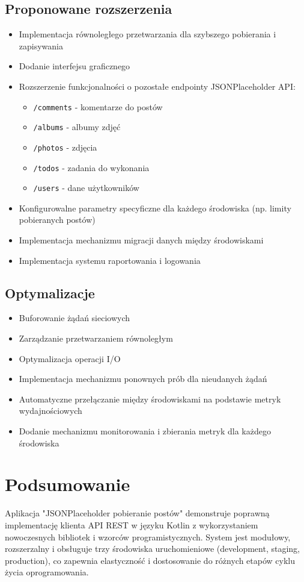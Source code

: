 \documentclass[12pt,a4paper]{article}
\begin{document}
\subsection{Proponowane rozszerzenia}
\begin{itemize}
    \item Implementacja równoległego przetwarzania dla szybszego pobierania i zapisywania
    \item Dodanie interfejsu graficznego
    \item Rozszerzenie funkcjonalności o pozostałe endpointy JSONPlaceholder API:
    \begin{itemize}
        \item \texttt{/comments} - komentarze do postów
        \item \texttt{/albums} - albumy zdjęć
        \item \texttt{/photos} - zdjęcia
        \item \texttt{/todos} - zadania do wykonania
        \item \texttt{/users} - dane użytkowników
    \end{itemize}
    \item Konfigurowalne parametry specyficzne dla każdego środowiska (np. limity pobieranych postów)
    \item Implementacja mechanizmu migracji danych między środowiskami
    \item Implementacja systemu raportowania i logowania
\end{itemize}

\subsection{Optymalizacje}
\begin{itemize}
    \item Buforowanie żądań sieciowych
    \item Zarządzanie przetwarzaniem równoległym
    \item Optymalizacja operacji I/O
    \item Implementacja mechanizmu ponownych prób dla nieudanych żądań
    \item Automatyczne przełączanie między środowiskami na podstawie metryk wydajnościowych
    \item Dodanie mechanizmu monitorowania i zbierania metryk dla każdego środowiska
\end{itemize}

\section{Podsumowanie}
Aplikacja "JSONPlaceholder pobieranie postów" demonstruje poprawną implementację klienta API REST w języku Kotlin z wykorzystaniem nowoczesnych bibliotek i wzorców programistycznych. System jest modułowy, rozszerzalny i obsługuje trzy środowiska uruchomieniowe (development, staging, production), co zapewnia elastyczność i dostosowanie do różnych etapów cyklu życia oprogramowania.
\end{document}
